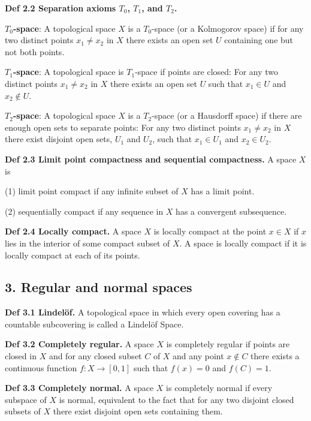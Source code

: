 \documentclass[11pt]{diazessay} %
\begin{document}
\vskip 12pt
\textbf{Def 2.2 Separation axioms $T_0$, $T_1$, and $T_2$.}

\vskip 3pt
\textbf{$T_0$-space}: A topological space $X$ is a $T_0$-space (or a
Kolmogorov space) if for any two distinct points $x_1 \not= x_2$ in $X$ there exists an open set $U$ containing one
but not both points.

\vskip 3pt
\textbf{$T_1$-space}: A topological space is $T_1$-space if points are closed: For any two distinct points $x_1 \not= x_2$ in $X$ there
exists an open set $U$ such that $x_1 \in U$ and $x_2 \not\in U$.

\vskip 3pt
\textbf{$T_2$-space}: A topological space $X$ is a $T_2$-space (or a Hausdorff space) if there are enough open sets to separate
points: For any two distinct points $x_1 \not= x_2$ in $X$ there exist disjoint open sets, $U_1$ and $U_2$, such that
$x_1 \in U_1$ and $x_2 \in U_2$.

\vskip 12pt
\textbf{Def 2.3 Limit point compactness and sequential compactness.} A space $X$ is

\vskip 3pt
(1) limit point compact if any infinite subset of $X$ has a limit point.

\vskip 3pt
(2) sequentially compact if any sequence in $X$ has a convergent subsequence.

\vskip 12pt
\textbf{Def 2.4 Locally compact.}  A space $X$ is locally compact at the point $x \in X$ if $x$ lies in the interior of some
compact subset of $X$. 
A space is locally compact if it is locally compact at each of its points.

\subsection*{3. Regular and normal spaces}

\vskip 3pt
\textbf{Def 3.1 Lindelöf.} A topological space in which every open covering has a countable subcovering is called a Lindelöf Space.

\vskip 12pt
\textbf{Def 3.2 Completely regular.} A space $X$ is completely regular if points are closed in $X$ and for any closed
subset $C$ of $X$ and any point $x \not\in C$ there exists a continuous function $f : X \rightarrow [0, 1]$ such that $f (x) = 0$
and $f (C) = 1$.

\vskip 12pt
\textbf{Def 3.3 Completely normal.} A space $X$ is completely normal if every subspace of $X$ is normal, equivalent to the fact that for any two disjoint closed subsets of $X$ there exist disjoint open sets containing them.
\end{document}
